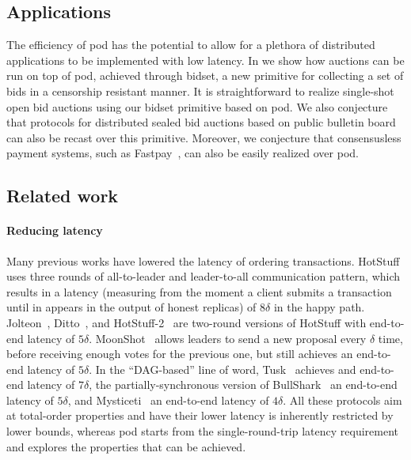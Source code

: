 \documentclass[pdflatex,sn-mathphys-num]{sn-jnl}%
\theoremstyle{thmstyleone}%
\theoremstyle{thmstyletwo}%
\theoremstyle{thmstylethree}%
\newcommand{\podtm}{\textsf{pod}\xspace}
\newcommand{\bidsettm}{\textsf{bidset}\xspace}
\newcommand{\dotparagraph}[1]{\paragraph*{#1}}
\begin{document}
\subsection{Applications}\label{sec:applications}
The efficiency of \podtm has the potential to allow for a plethora of distributed applications to be implemented with low latency. In  we show how auctions can be run on top of \podtm, achieved through \bidsettm, a new primitive for collecting a set of bids in a censorship resistant manner. It is straightforward to realize single-shot open bid auctions using our \bidsettm primitive based on \podtm. We also conjecture that protocols for distributed sealed bid auctions based on public bulletin board can also be recast over this primitive. Moreover, we conjecture that consensusless payment systems, such as Fastpay~\cite{DBLP:conf/aft/BaudetDS20}, can also be easily realized over \podtm.


\subsection{Related work}\label{app:related}

\dotparagraph{Reducing latency}
Many previous works have lowered the latency of ordering transactions.
HotStuff~\cite{DBLP:conf/podc/YinMRGA19} uses three rounds of all-to-leader and leader-to-all communication pattern, which results in a latency (measuring from the moment a client submits a transaction until in appears in the output of honest replicas) of $8\delta$ in the happy path.
Jolteon~\cite{DBLP:conf/fc/GelashviliKSSX22}, Ditto~\cite{DBLP:conf/fc/GelashviliKSSX22}, and HotStuff-2~\cite{DBLP:journals/iacr/MalkhiN23} are two-round versions of HotStuff with end-to-end latency of $5\delta$.
MoonShot~\cite{DBLP:journals/corr/abs-2401-01791} allows leaders to send a new proposal every $\delta$ time, before receiving enough votes for the previous one, but still achieves an end-to-end latency of $5\delta$.
In the ``DAG-based'' line of word, Tusk~\cite{DBLP:conf/eurosys/DanezisKSS22} achieves and end-to-end latency of $7\delta$,
the partially-synchronous version of BullShark~\cite{DBLP:journals/corr/abs-2209-05633} an end-to-end latency of $5\delta$,
and Mysticeti~\cite{DBLP:journals/corr/abs-2310-14821} an end-to-end latency of $4\delta$.
All these protocols aim at total-order properties and have their lower latency is inherently restricted by lower bounds, whereas \podtm starts from the single-round-trip latency requirement and explores the properties that can be achieved.
\end{document}
